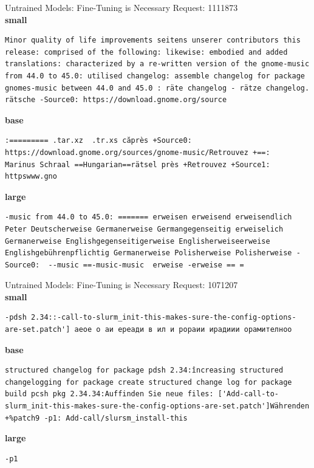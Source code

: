 \documentclass[aspectratio=169]{beamer}
\begin{document}
\begin{frame}[fragile]{Untrained Models: Fine-Tuning is Necessary}
Request: 1111873\\
\textbf{small}
\begin{lstlisting}[basicstyle=\ttfamily\tiny]
Minor quality of life improvements seitens unserer contributors this release: comprised of the following: likewise: embodied and added translations: characterized by a re-written version of the gnome-music from 44.0 to 45.0: utilised changelog: assemble changelog for package gnomes-music between 44.0 and 45.0 : räte changelog - rätze changelog. rätsche -Source0: https://download.gnome.org/source
\end{lstlisting}
\textbf{base}
\begin{lstlisting}[basicstyle=\ttfamily\tiny]
:========= .tar.xz  .tr.xs căprès +Source0: https://download.gnome.org/sources/gnome-music/Retrouvez +==:   Marinus Schraal ==Hungarian==rätsel près +Retrouvez +Source1: httpswww.gno
\end{lstlisting}
\textbf{large}
\begin{lstlisting}[basicstyle=\ttfamily\tiny]
-music from 44.0 to 45.0: ======= erweisen erweisend erweisendlich Peter Deutscherweise Germanerweise Germangegenseitig erweiselich Germanerweise Englishgegenseitigerweise Englisherweiseerweise Englishgebührenpflichtig Germanerweise Polisherweise Polisherweise -Source0:  --music ==-music-music  erweise -erweise == =
\end{lstlisting}
\end{frame}

\begin{frame}[fragile]{Untrained Models: Fine-Tuning is Necessary}
Request: 1071207\\
\textbf{small}
\begin{lstlisting}[basicstyle=\ttfamily\tiny]
-pdsh 2.34::-call-to-slurm_init-this-makes-sure-the-config-options-are-set.patch'] аеое о аи ереади в ил и рораии ирадиии орамителноо
\end{lstlisting}
\textbf{base}
\begin{lstlisting}[basicstyle=\ttfamily\tiny]
structured changelog for package pdsh 2.34:încreasing structured changelogging for package create structured change log for package build pcsh pkg 2.34.34:Auffinden Sie neue files: ['Add-call-to-slurm_init-this-makes-sure-the-config-options-are-set.patch']Währenden +%patch9 -p1: Add-call/slursm_install-this
\end{lstlisting}
\textbf{large}
\begin{lstlisting}[basicstyle=\ttfamily\tiny]
 -p1
\end{lstlisting}
\end{frame}
\end{document}
